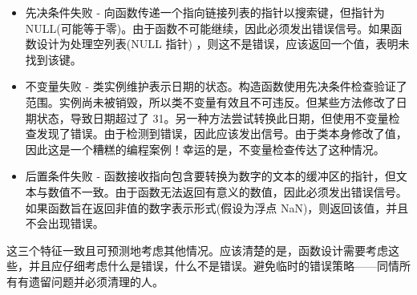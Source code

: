 \begin{itemize}
\item
先决条件失败 - 向函数传递一个指向链接列表的指针以搜索键，但指针为 NULL(可能等于零)。由于函数不可能继续，因此必须发出错误信号。如果函数设计为处理空列表(NULL 指针) ，则这不是错误，应该返回一个值，表明未找到该键。

\item
不变量失败 - 类实例维护表示日期的状态。构造函数使用先决条件检查验证了范围。实例尚未被销毁，所以类不变量有效且不可违反。但某些方法修改了日期状态，导致日期超过了 31。另一种方法尝试转换此日期，但使用不变量检查发现了错误。由于检测到错误，因此应该发出信号。由于类本身修改了值，因此这是一个糟糕的编程案例！幸运的是，不变量检查传达了这种情况。

\item
后置条件失败 - 函数接收指向包含要转换为数字的文本的缓冲区的指针，但文本与数值不一致。由于函数无法返回有意义的数值，因此必须发出错误信号。如果函数旨在返回非值的数字表示形式(假设为浮点 NaN)，则返回该值，并且不会出现错误。
\end{itemize}

这三个特征一致且可预测地考虑其他情况。应该清楚的是，函数设计需要考虑这些，并且应仔细考虑什么是错误，什么不是错误。避免临时的错误策略——同情所有有遗留问题并必须清理的人。
